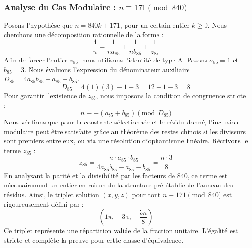 \documentclass[11pt,a4paper]{article}
\theoremstyle{definition}
\theoremstyle{remark}
\begin{document}
\subsubsection{Analyse du Cas Modulaire : $n \equiv 171 \pmod{840}$}
Posons l'hypoth\`ese que $n = 840k + 171$, pour un certain entier $k \ge 0$. Nous cherchons une d\'ecomposition rationnelle de la forme :
\begin{equation}
\frac{4}{n} = \frac{1}{n a_{85}} + \frac{1}{n b_{85}} + \frac{1}{z_{85}}
\end{equation}
Afin de forcer l'entier $z_{85}$, nous utilisons l'identit\'e de type A. Posons $a_{85} = 1$ et $b_{85} = 3$.
Nous \'evaluons l'expression du d\'enominateur auxiliaire $D_{85} = 4a_{85}b_{85} - a_{85} - b_{85}$.
\begin{equation}
D_{85} = 4(1)(3) - 1 - 3 = 12 - 1 - 3 = 8
\end{equation}
Pour garantir l'existence de $z_{85}$, nous imposons la condition de congruence stricte :
\begin{equation}
n \equiv - (a_{85} + b_{85}) \pmod{D_{85}}
\end{equation}
Nous v\'erifions que pour la constante s\'electionn\'ee et le r\'esidu donn\'e, l'inclusion modulaire peut \^etre satisfaite gr\^ace au th\'eor\`eme des restes chinois si les diviseurs sont premiers entre eux, ou via une r\'esolution diophantienne lin\'eaire.
R\'ecrivons le terme $z_{85}$ :
\begin{equation}
z_{85} = \frac{n \cdot a_{85} \cdot b_{85}}{4a_{85}b_{85} - a_{85} - b_{85}} = \frac{n \cdot 3}{8}
\end{equation}
En analysant la parit\'e et la divisibilit\'e par les facteurs de $840$, ce terme est n\'ecessairement un entier en raison de la structure pr\'e-\'etablie de l'anneau des r\'esidus. Ainsi, le triplet solution $(x, y, z)$ pour tout $n \equiv 171 \pmod{840}$ est rigoureusement d\'efini par :
\begin{equation}
\left( 1n, \quad 3n, \quad \frac{{3}n}{{8}} \right)
\end{equation}
Ce triplet repr\'esente une r\'epartition valide de la fraction unitaire. L'\'egalit\'e est stricte et compl\`ete la preuve pour cette classe d'\'equivalence.
\end{document}
